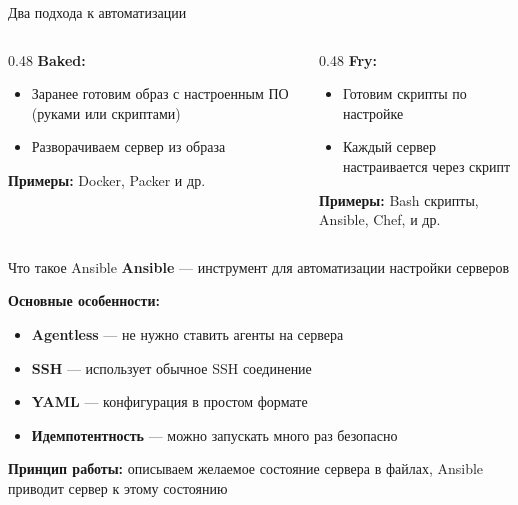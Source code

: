 \documentclass[aspectratio=169]{beamer}
\begin{document}
    \begin{frame}{Два подхода к автоматизации}
        \begin{columns}[t]
            \begin{column}[t]{0.48\textwidth}
                \textbf{Baked:}
                \begin{itemize}
                    \item Заранее готовим образ с настроенным ПО (руками или скриптами)
                    \item Разворачиваем сервер из образа
                \end{itemize}
                
                \vspace{0.3cm}
                \textbf{Примеры:} Docker, Packer и др.
            \end{column}
            
            \begin{column}[t]{0.48\textwidth}
                \textbf{Fry:}
                \begin{itemize}
                    \item Готовим скрипты по настройке
                    \item Каждый сервер настраивается через скрипт
                \end{itemize}
                
                \vspace{0.3cm}
                \textbf{Примеры:} Bash скрипты, Ansible, Chef, и др.
            \end{column}
        \end{columns}
        
    \end{frame}

    \begin{frame}{Что такое Ansible}
        \textbf{Ansible} — инструмент для автоматизации настройки серверов
        
        \vspace{0.3cm}
        
        \textbf{Основные особенности:}
        \begin{itemize}
            \item \textbf{Agentless} — не нужно ставить агенты на сервера
            \item \textbf{SSH} — использует обычное SSH соединение
            \item \textbf{YAML} — конфигурация в простом формате
            \item \textbf{Идемпотентность} — можно запускать много раз безопасно
        \end{itemize}
        
        \vspace{0.5cm}
        
        \textbf{Принцип работы:} описываем желаемое состояние сервера в файлах, Ansible приводит сервер к этому состоянию
    \end{frame}
\end{document}
